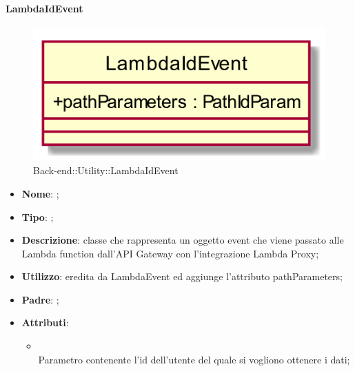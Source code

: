 \hypertarget{LambdaIdEvent_label}{\paragraph{LambdaIdEvent}}
\begin{figure}[h]
	\centering
	\includegraphics[width=\textwidth,height=\textheight,keepaspectratio]{images/ClassLambdaIdEvent.png}
	\caption{Back-end::Utility::LambdaIdEvent}
\end{figure}
\begin{itemize}
	\item \textbf{Nome}: ;
	\item \textbf{Tipo}: ;
	\item \textbf{Descrizione}: classe che rappresenta un oggetto event che viene passato alle Lambda function dall'API Gateway con l'integrazione Lambda Proxy;
	\item \textbf{Utilizzo}: eredita da LambdaEvent ed aggiunge l'attributo pathParameters;
	\item \textbf{Padre}: ;
	\item \textbf{Attributi}:
	\begin{itemize}
		\item[]  \\
		Parametro contenente l'id dell'utente del quale si vogliono ottenere i dati;
	\end{itemize}
\end{itemize}

